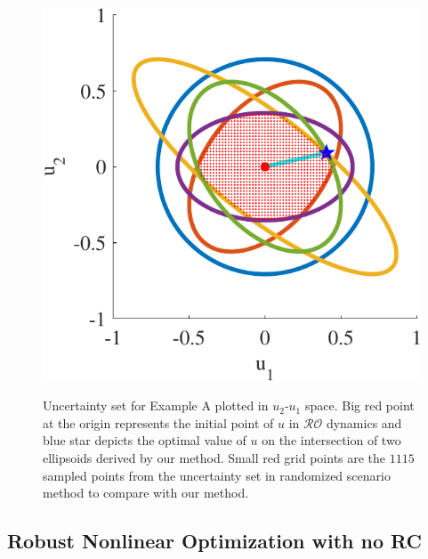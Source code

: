 \documentclass[journal,twoside,web]{ieeecolor}
\newcommand{\rev}[1]{\textcolor{revisionblue}{#1}}
\begin{document}
\begin{figure}
\begin{center}
\includegraphics[scale=0.55]{ellipsoids}
\vspace{-1.5mm}
\caption{\rev{Uncertainty set for Example A plotted in $u_
2$-$u_1$ space. Big red point at the origin represents the initial point of $u$ in $\mathcal{RO}$ dynamics and blue star depicts the optimal value of $u$ on the intersection of two ellipsoids derived by our method. Small red grid points are the $1115$ sampled points from the uncertainty set in randomized scenario method \cite{calafiore2004} to compare with our method.}}
\vspace{-8mm}
\label{ellipsoids}
\end{center}
\end{figure}

\subsection{Robust Nonlinear Optimization with no RC}\label{norc.sec}
\end{document}
